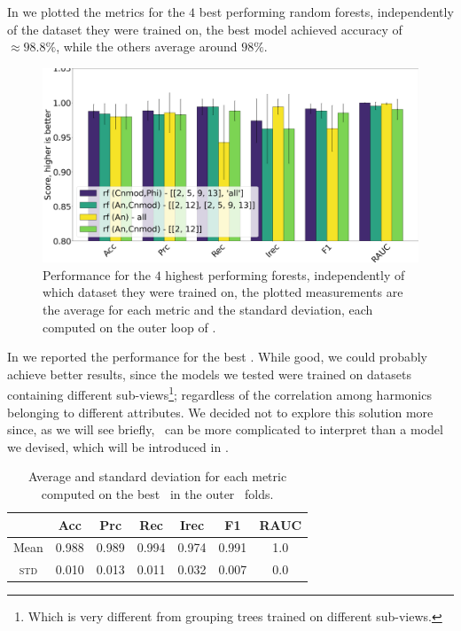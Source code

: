 In  we plotted the metrics for the $4$ best performing random forests,
independently of the dataset they were trained on, the best model achieved accuracy of
$\approx 98.8\%$, while the others average around $98\%$.
\begin{figure}[!ht]
	\centering
	\includegraphics[width=\linewidth]{img/best_rfs.png}
	\caption{Performance for the $4$ highest performing forests, independently of which
		dataset they were trained on, the plotted measurements are the average for each metric and
		the standard deviation, each computed on the outer loop of \ncv.} \label{fig:best-rfs}
\end{figure}
In  we reported the performance for the best \rf. While good, we could probably achieve better
results, since the models we tested were trained on datasets containing different sub-views\footnote{Which is very different from grouping trees trained on different
	sub-views.}; regardless of the correlation among harmonics belonging to different attributes. We
decided not to explore this solution more since, as we will see briefly, \rfs\ can be more
complicated to interpret than a model we devised, which will be introduced in .
\begin{table}[!ht]
	\caption{Average and standard deviation for each metric computed on the best \rf\ in the outer \cv\ folds.}\label{tbl:rf-cnmod-phi-perf}

	\bigskip
	\setlength{\tabcolsep}{6pt}
	\centering
	\begin{tabular}{ccccccc}
		\toprule
		\textbf{}    & \textbf{Acc} & \textbf{Prc} & \textbf{Rec} & \textbf{Irec} & \textbf{F1} & \textbf{RAUC} \\
		\midrule
		Mean         & 0.988        & 0.989        & 0.994        & 0.974         & 0.991
		             & 1.0                                                                                      \\
		\textsc{std} & 0.010        & 0.013        & 0.011        & 0.032         & 0.007
		             & 0.0                                                                                      \\
		\bottomrule
	\end{tabular}
\end{table}
